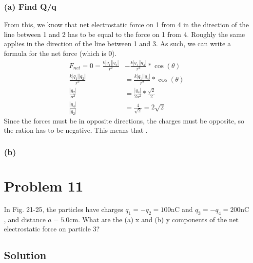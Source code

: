 \documentclass[12pt]{article}
\begin{document}
\subsubsection*{(a) Find Q/q}
From this, we know that net electrostatic force on 1 from 4 in the direction of the line between 1 and 2 has to be equal to the force on 1 from 4. Roughly the same applies in the direction of the line between 1 and 3. As such, we can write a formula for the net force (which is 0).
\begin{align*}
    F_{net} = 0 = \frac{k\left|q_1\right|\left|q_2\right|}{r^2} &- \frac{k\left|q_1\right|\left|q_4\right|}{r^2}*\cos(\theta)\\
    \frac{k\left|q_1\right|\left|q_2\right|}{r^2} &= \frac{k\left|q_1\right|\left|q_4\right|}{r^2}*\cos(\theta)\\
    \frac{\left|q_2\right|}{a^2} &= \frac{\left|q_4\right|}{2a^2}*\frac{\sqrt{2}}{2}\\
    \frac{\left|q_4\right|}{\left|q_2\right|} &= \frac{4}{\sqrt{2}} = 2\sqrt{2}
\end{align*}
Since the forces must be in opposite directions, the charges must be opposite, so the ration has to be negative. This means that .

\subsubsection*{(b)}


\pagebreak
\section*{Problem 11}
In Fig. 21-25, the particles have charges $q_1 = -q_2 = 100 \unit{\nano\coulomb}$ and $q_3 = -q_4 = 200 \unit{\nano\coulomb}$, and distance $a = 5.0\unit{\centi\meter}$. What are the (a) x and (b) y components of the net electrostatic force on particle 3?

\subsection*{Solution}



\pagebreak
\end{document}

